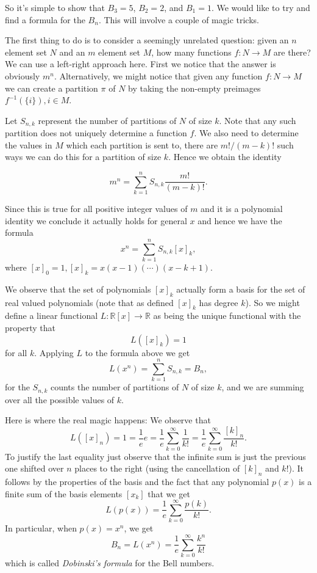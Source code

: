 So it's simple to show that $B_3 = 5$, $B_2 = 2$, and $B_1 = 1$. We would like to try and find a formula for the $B_n$. This will involve a couple of magic tricks.

The first thing to do is to consider a seemingly unrelated question: given an $n$ element set $N$ and an $m$ element set $M$, how many functions $f: N \to M$ are there? We can use a left-right approach here. First we notice that the answer is obviously $m^n$. Alternatively, we might notice that given any function $f:N \to M$ we can create a partition $\pi$ of $N$ by taking the non-empty preimages $f^{-1}(\{i\}), i \in M$. 

Let $S_{n, k}$ represent the number of partitions of $N$ of size $k$. Note that any such partition does not uniquely determine a function $f$. We also need to determine the values in $M$ which each partition is sent to, there are $m!/(m-k)!$ such ways we can do this for a partition of size $k$. Hence we obtain the identity

\[m^n = \sum_{k = 1}^{n}S_{n,k}\frac{m!}{(m-k)!}.\]

Since this is true for all positive integer values of $m$ and it is a polynomial identity we conclude it actually holds for general $x$ and hence we have the formula 
\[x^n = \sum_{k = 1}^{n}S_{n,k}[x]_k,\]
where $[x]_0 = 1, [x]_k = x(x-1)(\cdots)(x - k + 1).$

We observe that the set of polynomials $[x]_k$ actually form a basis for the set of real valued polynomials (note that as defined $[x]_k$ has degree $k$). So we might define a linear functional $L: \mathbb{R}[x] \to \mathbb{R}$ as being the unique functional with the property that
\[L([x]_k) = 1\] for all $k$. Applying $L$ to the formula above we get
\[L(x^n) = \sum_{k = 1}^nS_{n,k} = B_n,\] for the $S_{n,k}$ counts the number of partitions of $N$ of size $k$, and we are summing over all the possible values of $k$.

Here is where the real magic happens: We observe that 
\[L([x]_n) = 1 = \frac{1}{e}e = \frac{1}{e}\sum_{k = 0}^{\infty}\frac{1}{k!} = \frac{1}{e}\sum_{k = 0}^{\infty}\frac{[k]_n}{k!}.\]
To justify the last equality just observe that the infinite sum is just the previous one shifted over $n$ places to the right (using the cancellation of $[k]_n$ and $k!$). It follows by the properties of the basis and the fact that any polynomial $p(x)$ is a finite sum of the basis elements $[x_k]$ that we get
\[L(p(x)) = \frac{1}{e}\sum_{k = 0}^{\infty}\frac{p(k)}{k!}.\] In particular, when $p(x) = x^n$, we get
\[B_n = L(x^n) = \frac{1}{e}\sum_{k = 0}^{\infty}\frac{k^n}{k!}\]
which is called \textit{Dobinski's formula} for the Bell numbers.